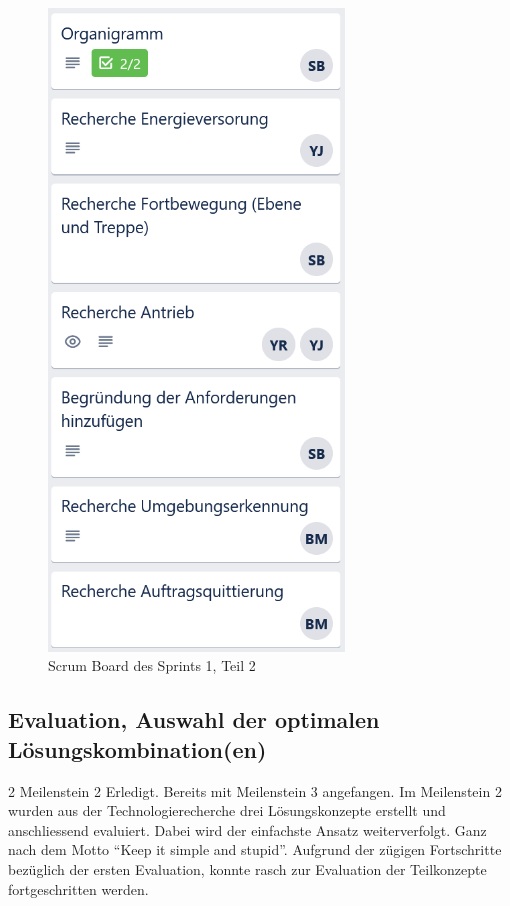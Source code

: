 \begin{figure}[H]
\begin{minipage}[t]{0.45\linewidth}
  \includegraphics[width=0.7\textwidth]{img/Trello/Trello-Bord_1_Nr2.PNG}
  \caption{Scrum Board des Sprints 1, Teil 2}
  \label{Scrum Board 2.2}
  \end{minipage}
\end{figure}

\subsection*{Evaluation, Auswahl der optimalen Lösungskombination(en)}
\workday
    {2}
    {\ok Meilenstein 2 Erledigt. Bereits mit Meilenstein 3 angefangen.}
    {
      Im Meilenstein 2 wurden aus der Technologierecherche drei Lösungskonzepte erstellt
      und anschliessend evaluiert. Dabei wird der einfachste Ansatz weiterverfolgt. 
      Ganz nach dem Motto ``Keep it simple and stupid''.
    }
    {
      Aufgrund der zügigen Fortschritte bezüglich der ersten Evaluation, konnte rasch zur Evaluation der Teilkonzepte fortgeschritten werden.
    }

